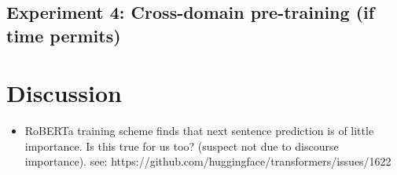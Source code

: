 \documentclass[11pt,a4paper]{article}
\begin{document}
\subsection{Experiment 4: Cross-domain pre-training (if time permits)} %

\section{Discussion} %
\begin{itemize}
  \item RoBERTa training scheme finds that next sentence prediction is of little importance. Is this true for us too? (suspect not due to discourse importance). see: https://github.com/huggingface/transformers/issues/1622
\end{itemize}



\end{document}
